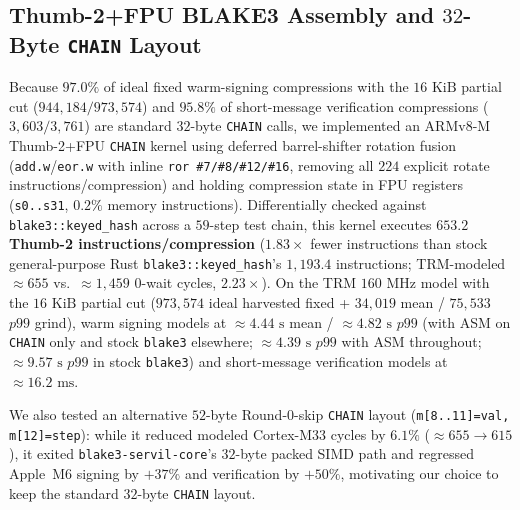 \documentclass[11pt,a4paper]{article}
\theoremstyle{definition}
\theoremstyle{remark}
\newcommand{\BLAKE}{\textsf{BLAKE3}}
\begin{document}
\subsection{Thumb-2+FPU \BLAKE{} Assembly and $32$-Byte \texttt{CHAIN} Layout}
Because $97.0\%$ of ideal fixed warm-signing compressions with the $16\text{ KiB}$ partial cut ($944{,}184 / 973{,}574$) and $95.8\%$ of short-message verification compressions ($3{,}603 / 3{,}761$) are standard $32$-byte \texttt{CHAIN} calls, we implemented an ARMv8-M Thumb-2+FPU \texttt{CHAIN} kernel using deferred barrel-shifter rotation fusion (\texttt{add.w}/\texttt{eor.w} with inline \texttt{ror \#7/\#8/\#12/\#16}, removing all $224$ explicit rotate instructions/compression) and holding compression state in FPU registers (\texttt{s0..s31}, $0.2\%$ memory instructions). Differentially checked against \texttt{blake3::keyed\_hash} across a $59$-step test chain, this kernel executes \textbf{$653.2$ Thumb-2 instructions/compression} ($1.83\times$ fewer instructions than stock general-purpose Rust \texttt{blake3::keyed\_hash}'s $1{,}193.4$ instructions; TRM-modeled $\approx 655$ vs.\ $\approx 1{,}459$ $0$-wait cycles, $2.23\times$). On the TRM $160\text{ MHz}$ model with the $16\text{ KiB}$ partial cut ($973{,}574$ ideal harvested fixed + $34{,}019$ mean / $75{,}533$ $p99$ grind), warm signing models at $\approx 4.44\text{ s}$ mean / $\approx 4.82\text{ s}$ $p99$ (with ASM on \texttt{CHAIN} only and stock \texttt{blake3} elsewhere; $\approx 4.39\text{ s}$ $p99$ with ASM throughout; $\approx 9.57\text{ s}$ $p99$ in stock \texttt{blake3}) and short-message verification models at $\approx 16.2\text{ ms}$.

We also tested an alternative $52$-byte Round-$0$-skip \texttt{CHAIN} layout (\texttt{m[8..11]=val, m[12]=step}): while it reduced modeled Cortex-M33 cycles by $6.1\%$ ($\approx 655 \to 615$), it exited \texttt{blake3-servil-core}'s $32$-byte packed SIMD path and regressed Apple~M6 signing by $+37\%$ and verification by $+50\%$, motivating our choice to keep the standard $32$-byte \texttt{CHAIN} layout.
\end{document}
